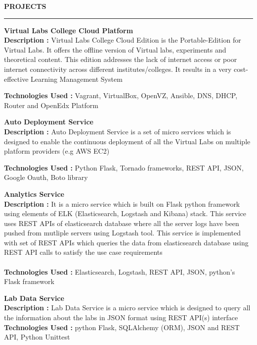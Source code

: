 \documentclass{resume} %
\begin{document}

\textbf{PROJECTS}
\sectionlineskip
\hrule \textbf{Virtual Labs College Cloud Platform}
\\ \textbf{Description :} Virtual Labs College Cloud Edition
is the Portable-Edition for Virtual Labs. It offers the
offline version of Virtual labs, experiments and theoretical
content. This edition addresses the lack of internet access
or poor internet connectivity across different
institutes/colleges. It results in a very cost-effective
Learning Management System

\textbf{Technologies
  Used :} Vagrant, VirtualBox, OpenVZ, Ansible, DNS, DHCP,
Router and OpenEdx Platform
\bigskip

\textbf{Auto Deployment Service}
\\ \textbf{Description :} Auto Deployment Service is a set
of micro services which is designed to enable the continuous
deployment of all the Virtual Labs on multiple platform
providers (e.g AWS EC2)

\textbf{Technologies Used :} Python Flask, Tornado
frameworks, REST API, JSON, Google Oauth, Boto library

\bigskip

\textbf{Analytics Service} \\ \textbf{Description :} It is a
micro service which is built on Flask python framework using
elements of ELK (Elasticsearch, Logstash and Kibana)
stack. This service uses REST APIs of elasticsearch database
where all the server logs have been pushed from mutliple
servers using Logstash tool. This service is implemented
with set of REST APIs which queries the data from
elasticsearch database using REST API calls to satisfy the
use case requirements\\ \\ \textbf{Technologies Used :}
Elasticsearch, Logstash, REST API, JSON, python's Flask
framework

\bigskip

\textbf{Lab Data Service} \\ \textbf{Description :} Lab Data
Service is a micro service which is designed to query all
the information about the labs in JSON format using REST
API(s) interface \\ \textbf{Technologies Used :} python
Flask, SQLAlchemy (ORM), JSON and REST API, Python Unittest
\end{document}

